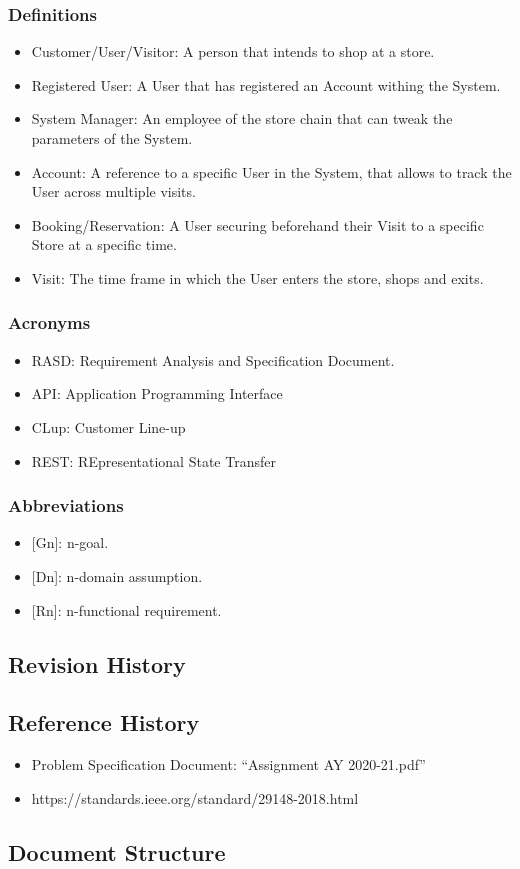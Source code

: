 \subsubsection{Definitions}
\begin{itemize}
    \item Customer/User/Visitor: A person that intends to shop at a store.
    \item Registered User: A User that has registered an Account withing the System.
    \item System Manager: An employee of the store chain that can tweak the parameters of the System.
    \item Account: A reference to a specific User in the System, that allows to track the User across multiple visits.
    \item Booking/Reservation: A User securing beforehand their Visit to a specific Store at a specific time.
    \item Visit: The time frame in which the User enters the store, shops and exits.
\end{itemize}

\subsubsection{Acronyms}
\begin{itemize}
    \item RASD: Requirement Analysis and Specification Document.
    \item API: Application Programming Interface
    \item CLup: Customer Line-up
    \item REST: REpresentational State Transfer
\end{itemize}


\subsubsection{Abbreviations}
\begin{itemize}
    \item {[Gn]}: n-goal.
    \item {[Dn]}: n-domain assumption.
    \item {[Rn]}: n-functional requirement.
\end{itemize}

\subsection{Revision History}
\subsection{Reference History}
\begin{itemize}
    \item Problem Specification Document: ``Assignment AY 2020-21.pdf''
    \item https://standards.ieee.org/standard/29148-2018.html
\end{itemize}
\subsection{Document Structure}
